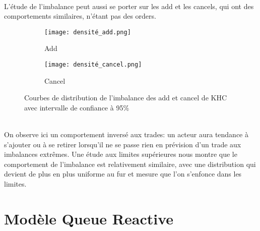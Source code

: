 \documentclass[12pt,a4paper]{article}
\theoremstyle{definition}
\theoremstyle{remark}
\begin{document}
\\
L'étude de l'imbalance peut aussi se porter sur les add et les cancels, qui ont des comportements similaires, n'étant pas des orders.
\begin{figure}[h!]
    \centering
    \begin{subfigure}[b]{0.48\textwidth}
        \centering
        \texttt{[image: densité\_add.png]}
        \caption{Add}
        \label{fig:imbalance}
    \end{subfigure}
    \hfill
    \begin{subfigure}[b]{0.48\textwidth}
        \centering
        \texttt{[image: densité\_cancel.png]}
        \caption{Cancel}
        \label{fig:densite_imbalance}
    \end{subfigure}
    \caption{Courbes de distribution de l'imbalance des add et cancel de KHC avec intervalle de confiance à 95\%}
    \label{fig:comparison}
\end{figure}
\\
On observe ici un comportement inversé aux trades: un acteur aura tendance à s'ajouter ou à se retirer lorsqu'il ne se passe rien en prévision d'un trade aux imbalances extrêmes. Une étude aux limites supérieures nous montre que le comportement de l'imbalance est relativement similaire, avec une distribution qui devient de plus en plus uniforme au fur et mesure que l'on s'enfonce dans les limites.
\\




\clearpage
\section{Modèle Queue Reactive}
\end{document}
